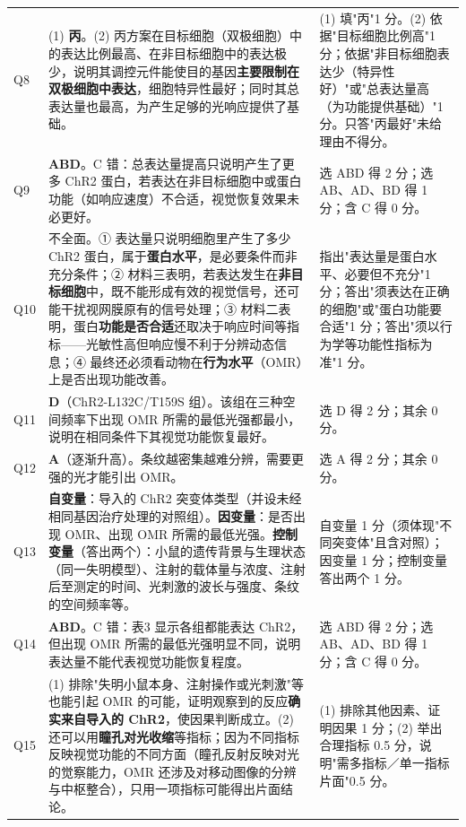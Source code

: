 \documentclass[UTF8,a4paper,11pt]{ctexart}
\begin{document}
\begin{longtable}{@{}p{0.9cm}p{9.5cm}p{4.3cm}@{}}
\addlinespace
Q8 & (1) \textbf{丙}。(2) 丙方案在目标细胞（双极细胞）中的表达比例最高、在非目标细胞中的表达极少，说明其调控元件能使目的基因\textbf{主要限制在双极细胞中表达}，细胞特异性最好；同时其总表达量也最高，为产生足够的光响应提供了基础。 & (1) 填"丙"1 分。(2) 依据"目标细胞比例高"1 分；依据"非目标细胞表达少（特异性好）"或"总表达量高（为功能提供基础）"1 分。只答"丙最好"未给理由不得分。 \\
\addlinespace
Q9 & \textbf{ABD}。C 错：总表达量提高只说明产生了更多 ChR2 蛋白，若表达在非目标细胞中或蛋白功能（如响应速度）不合适，视觉恢复效果未必更好。 & 选 ABD 得 2 分；选 AB、AD、BD 得 1 分；含 C 得 0 分。 \\
\addlinespace
Q10 & 不全面。① 表达量只说明细胞里产生了多少 ChR2 蛋白，属于\textbf{蛋白水平}，是必要条件而非充分条件；② 材料三表明，若表达发生在\textbf{非目标细胞}中，既不能形成有效的视觉信号，还可能干扰视网膜原有的信号处理；③ 材料二表明，蛋白\textbf{功能是否合适}还取决于响应时间等指标——光敏性高但响应慢不利于分辨动态信息；④ 最终还必须看动物在\textbf{行为水平}（OMR）上是否出现功能改善。 & 指出"表达量是蛋白水平、必要但不充分"1 分；答出"须表达在正确的细胞"或"蛋白功能要合适"1 分；答出"须以行为学等功能性指标为准"1 分。 \\
\addlinespace
Q11 & \textbf{D}（ChR2-L132C/T159S 组）。该组在三种空间频率下出现 OMR 所需的最低光强都最小，说明在相同条件下其视觉功能恢复最好。 & 选 D 得 2 分；其余 0 分。 \\
\addlinespace
Q12 & \textbf{A}（逐渐升高）。条纹越密集越难分辨，需要更强的光才能引出 OMR。 & 选 A 得 2 分；其余 0 分。 \\
\addlinespace
Q13 & \textbf{自变量}：导入的 ChR2 突变体类型（并设未经相同基因治疗处理的对照组）。\textbf{因变量}：是否出现 OMR、出现 OMR 所需的最低光强。\textbf{控制变量}（答出两个）：小鼠的遗传背景与生理状态（同一失明模型）、注射的载体量与浓度、注射后至测定的时间、光刺激的波长与强度、条纹的空间频率等。 & 自变量 1 分（须体现"不同突变体"且含对照）；因变量 1 分；控制变量答出两个 1 分。 \\
\addlinespace
Q14 & \textbf{ABD}。C 错：表3 显示各组都能表达 ChR2，但出现 OMR 所需的最低光强明显不同，说明表达量不能代表视觉功能恢复程度。 & 选 ABD 得 2 分；选 AB、AD、BD 得 1 分；含 C 得 0 分。 \\
\addlinespace
Q15 & (1) 排除"失明小鼠本身、注射操作或光刺激"等也能引起 OMR 的可能，证明观察到的反应\textbf{确实来自导入的 ChR2}，使因果判断成立。(2) 还可以用\textbf{瞳孔对光收缩}等指标；因为不同指标反映视觉功能的不同方面（瞳孔反射反映对光的觉察能力，OMR 还涉及对移动图像的分辨与中枢整合），只用一项指标可能得出片面结论。 & (1) 排除其他因素、证明因果 1 分；(2) 举出合理指标 0.5 分，说明"需多指标／单一指标片面"0.5 分。 \\

\end{longtable}
\end{document}

